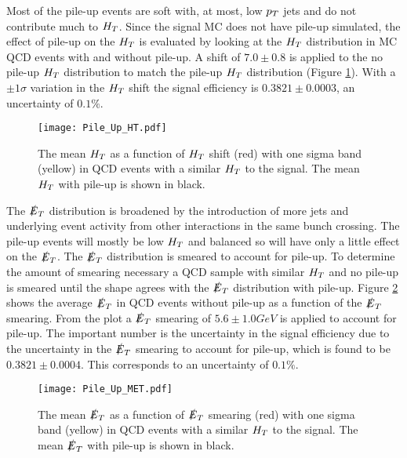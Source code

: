Most of the pile-up events are soft with, at most, low $p_{T}$ jets and do not
contribute much to $H_{T}$. Since the signal MC does not have pile-up simulated, 
the effect of pile-up on the $H_{T}$ is evaluated by looking at the $H_{T}$ 
distribution in MC QCD events with and without pile-up. A shift of $7.0\pm0.8$ 
is applied to the no pile-up $H_{T}$ distribution to match the pile-up $H_{T}$ 
distribution (Figure \ref{fig:Pile_Up_HT}). With a $\pm1\sigma$ variation in 
the $H_{T}$ shift the signal efficiency is $0.3821\pm0.0003$, an uncertainty of
$0.1\unit{\%}$. \\

\begin{figure}
\begin{center}
\texttt{[image: Pile\_Up\_HT.pdf]}
\end{center}
\caption{The mean $H_{T}$ as a function of $H_{T}$ shift (red) with one sigma band 
(yellow) in QCD events with a similar $H_{T}$ to the signal. The mean $H_{T}$ with 
pile-up is shown in black.}
\label{fig:Pile_Up_HT}
\end{figure}

The $\slashed{E}_{T}$ distribution is broadened by the introduction of more jets and
underlying event activity from other interactions in the same bunch crossing. 
The pile-up events will mostly be low $H_{T}$ and balanced so will have only a 
little effect on the $\slashed{E}_{T}$. The $\slashed{E}_{T}$ distribution is smeared to account for 
pile-up. To determine the amount of smearing necessary a QCD sample with similar 
$H_{T}$ and no pile-up is smeared until the shape agrees with the $\slashed{E}_{T}$ 
distribution with pile-up. Figure \ref{fig:Pile_Up_MET} shows the 
average $\slashed{E}_{T}$ in QCD events without pile-up as a function of the $\slashed{E}_{T}$ 
smearing. From the plot a $\slashed{E}_{T}$ smearing of $5.6\pm1.0\unit{GeV}$ is applied to 
account for pile-up. The important number is the uncertainty in
the signal efficiency due to the uncertainty in the $\slashed{E}_{T}$ smearing to account
for pile-up, which is found to be $0.3821\pm0.0004$. This corresponds to an
uncertainty of $0.1\unit{\%}$.\\

\begin{figure}
\begin{center}
\texttt{[image: Pile\_Up\_MET.pdf]}
\end{center}
\caption{The mean $\slashed{E}_{T}$ as a function of $\slashed{E}_{T}$ smearing (red) with one sigma
band (yellow) in QCD events with a similar $H_{T}$ to the signal. The mean $\slashed{E}_{T}$ 
with pile-up is shown in black.}
\label{fig:Pile_Up_MET}
\end{figure}

